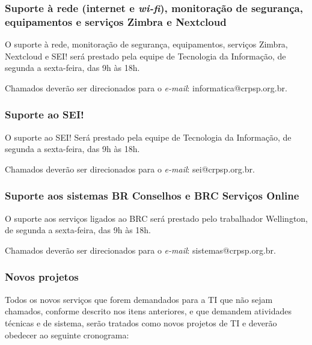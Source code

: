 \documentclass[openright, twoside, a4paper]{memoir}
\begin{document}
\subsubsection{\texorpdfstring{Suporte à rede (internet e
\emph{wi-fi}), monitoração de segurança, equipamentos e serviços Zimbra
e
Nextcloud}{Suporte à rede (internet e wi-fi), monitoração de segurança, equipamentos e serviços Zimbra e Nextcloud}}
\normalfont

O suporte à rede, monitoração de segurança, equipamentos, serviços
Zimbra, Nextcloud e SEI! será prestado pela equipe de Tecnologia da
Informação, de segunda a sexta-feira, das 9h às 18h.

Chamados deverão ser direcionados para o \emph{e-mail}:
informatica@crpsp.org.br.

\subsubsection{Suporte ao SEI!}

O suporte ao SEI! Será prestado pela equipe de Tecnologia da Informação,
de segunda a sexta-feira, das 9h às 18h.

Chamados deverão ser direcionados para o \emph{e-mail}:
sei@crpsp.org.br.

\subsubsection{Suporte aos sistemas BR Conselhos e BRC Serviços
Online}

O suporte aos serviços ligados ao BRC será prestado pelo trabalhador
Wellington, de segunda a sexta-feira, das 9h às 18h.

Chamados deverão ser direcionados para o \emph{e-mail}:
sistemas@crpsp.org.br.

\subsubsection{Novos projetos}

Todos os novos serviços que forem demandados para a TI que não sejam
chamados, conforme descrito nos itens anteriores, e que demandem
atividades técnicas e de sistema, serão tratados como novos projetos de
TI e deverão obedecer ao seguinte cronograma:
\end{document}
